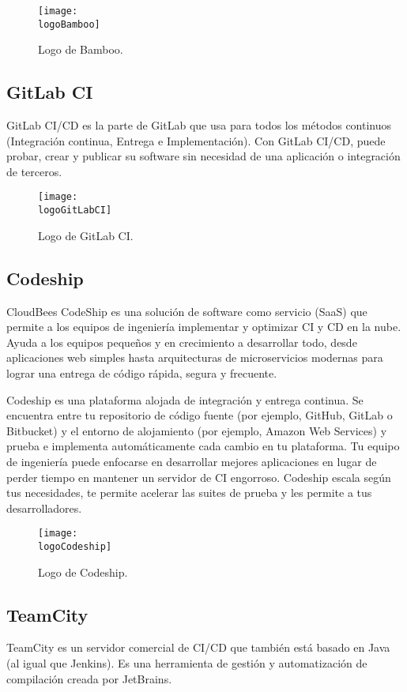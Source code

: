 \begin{figure}[h]
    \centering
    \texttt{[image: \\logoBamboo]}
    \caption{Logo de Bamboo.}
\end{figure}

\subsection{GitLab CI}
GitLab CI/CD es la parte de GitLab que usa para todos los métodos continuos (Integración continua, Entrega e Implementación). Con GitLab CI/CD, puede probar, crear y publicar su software sin necesidad de una aplicación o integración de terceros.

\begin{figure}[h]
    \centering
    \texttt{[image: \\logoGitLabCI]}
    \caption{Logo de GitLab CI.}
\end{figure}

\subsection{Codeship}
CloudBees CodeShip es una solución de software como servicio (SaaS) que permite a los equipos de ingeniería implementar y optimizar CI y CD en la nube. Ayuda a los equipos pequeños y en crecimiento a desarrollar todo, desde aplicaciones web simples hasta arquitecturas de microservicios modernas para lograr una entrega de código rápida, segura y frecuente.

Codeship es una plataforma alojada de integración y entrega continua. Se encuentra entre tu repositorio de código fuente (por ejemplo, GitHub, GitLab o Bitbucket) y el entorno de alojamiento (por ejemplo, Amazon Web Services) y prueba e implementa automáticamente cada cambio en tu plataforma. Tu equipo de ingeniería puede enfocarse en desarrollar mejores aplicaciones en lugar de perder tiempo en mantener un servidor de CI engorroso. Codeship escala según tus necesidades, te permite acelerar las suites de prueba y les permite a tus desarrolladores.

\begin{figure}[h]
    \centering
    \texttt{[image: \\logoCodeship]}
    \caption{Logo de Codeship.}
\end{figure}

\subsection{TeamCity}
TeamCity es un servidor comercial de CI/CD que también está basado en Java (al igual que Jenkins). Es una herramienta de gestión y automatización de compilación creada por JetBrains.

